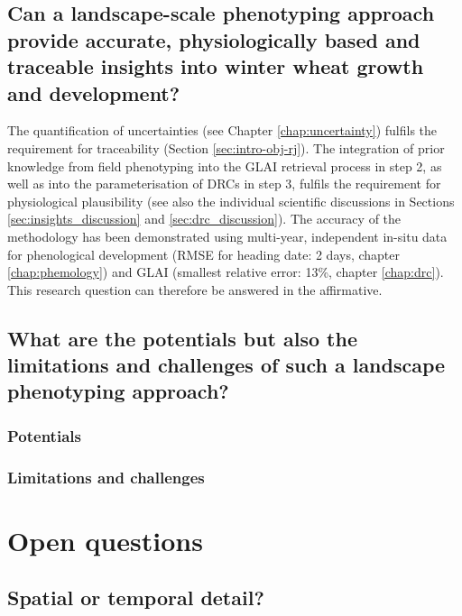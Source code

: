 \subsection{Can a landscape-scale phenotyping approach provide accurate, physiologically based and traceable insights into winter wheat growth and development?}
The quantification of uncertainties (see Chapter \ref{chap:uncertainty}) fulfils the requirement for traceability (Section \ref{sec:intro-obj-rj}). The integration of prior knowledge from field phenotyping into the \gls{GLAI} retrieval process in step 2, as well as into the parameterisation of \gls{DRC}s in step 3, fulfils the requirement for physiological plausibility (see also the individual scientific discussions in Sections \ref{sec:insights_discussion} and \ref{sec:drc_discussion}). The accuracy of the methodology has been demonstrated using multi-year, independent in-situ data for phenological development (RMSE for heading date: 2 days, chapter \ref{chap:phemology}) and GLAI (smallest relative error: 13\%, chapter \ref{chap:drc}). This research question can therefore be answered in the affirmative.

\subsection{What are the potentials but also the limitations and challenges of such a landscape phenotyping approach?}

\subsubsection{Potentials}

\subsubsection{Limitations and challenges}

\section{Open questions}
\subsection{Spatial or temporal detail?}

